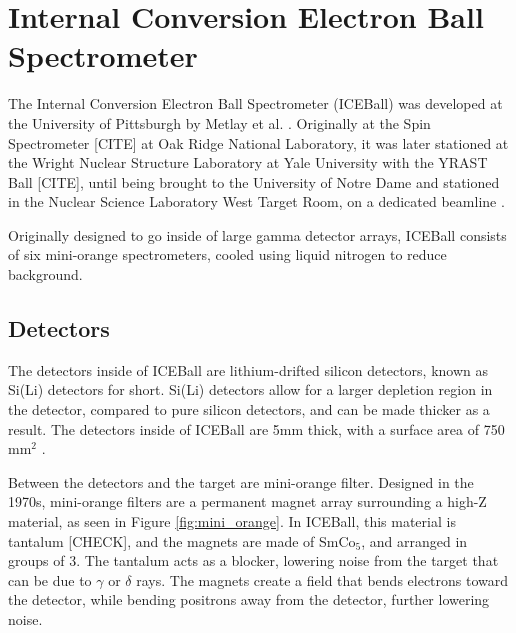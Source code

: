 \section{Internal Conversion Electron Ball Spectrometer}

The Internal Conversion Electron Ball Spectrometer (ICEBall) was developed at the University of Pittsburgh by Metlay et al. \citep{metlay92:_iceball_comm,metlay93:_iceball_comm}. Originally at the Spin Spectrometer [CITE] at Oak Ridge National Laboratory, it was later stationed at the Wright Nuclear Structure Laboratory at Yale University with the YRAST Ball [CITE], until being brought to the University of Notre Dame and stationed in the Nuclear Science Laboratory West Target Room, on a dedicated beamline \citep{battaglia15:_iceball_176lu}.

Originally designed to go inside of large gamma detector arrays, ICEBall consists of six mini-orange spectrometers, cooled using liquid nitrogen to reduce background. 

\subsection{Detectors}

The detectors inside of ICEBall are lithium-drifted silicon detectors, known as Si(Li) detectors for short. Si(Li) detectors allow for a larger depletion region in the detector, compared to pure silicon detectors, and can be made thicker as a result. The detectors inside of ICEBall are 5mm thick, with a surface area of 750 mm$^2$ \citep{metlay93:_iceball_comm}.

Between the detectors and the target are mini-orange filter. Designed in the 1970s, mini-orange filters are a permanent magnet array surrounding a high-Z material, as seen in Figure \ref{fig:mini_orange}. In ICEBall, this material is tantalum [CHECK], and the magnets are made of SmCo$_5$, and arranged in groups of 3. The tantalum acts as a blocker, lowering noise from the target that can be due to $\gamma$ or $\delta$ rays. The magnets create a field that bends electrons toward the detector, while bending positrons away from the detector, further lowering noise. 

